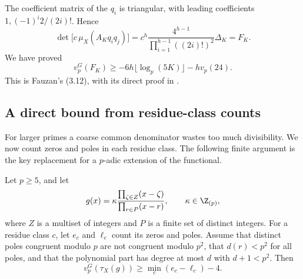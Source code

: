 The coefficient matrix of the $q_i$ is triangular, with leading
coefficients $1,(-1)^i2/(2i)!$. Hence
\[
 \det\bigl[c\,\mu_X(A_Kq_iq_j)\bigr]
 =c^h\frac{4^{h-1}}{\prod_{i=1}^{h-1}((2i)!)^2}\Delta_K
 =F_K.
\]
We have proved
\begin{equation}\label{arith:small}
 \boxed{\quad v_p^G(F_K)\ge
 -6h\lfloor\log_p(5K)\rfloor-hv_p(24).\quad}
\end{equation}
This is Fauzan's (3.12), with its direct proof in
\cite[\texttt{SmallPrimeF.lean}, \texttt{small\_prime\_bound}]{firsching}.

\subsection{A direct bound from residue-class counts}

For larger primes a coarse common denominator wastes too much
divisibility. We now count zeros and poles in each residue class.
The following finite argument is the key replacement for a
$p$-adic extension of the functional.

\begin{lemma}\label{arith:direct}
Let $p\ge5$, and let
\[
 g(x)=\kappa\frac{\prod_{\zeta\in Z}(x-\zeta)}
                         {\prod_{r\in P}(x-r)},\qquad
 \kappa\in\Z_{(p)},
\]
where $Z$ is a multiset of integers and $P$ is a finite set of distinct
integers. For a residue class $c$, let $e_c$ and $\ell_c$ count its
zeros and poles. Assume that distinct poles congruent modulo $p$
are not congruent modulo $p^2$, that $d(r)<p^2$ for all poles, and that
the polynomial part has degree at most $d$ with $d+1<p^2$.
Then
\[
 v_p^G(\tau_X(g))\ge\min_c(e_c-\ell_c)-4.
\]
\end{lemma}

